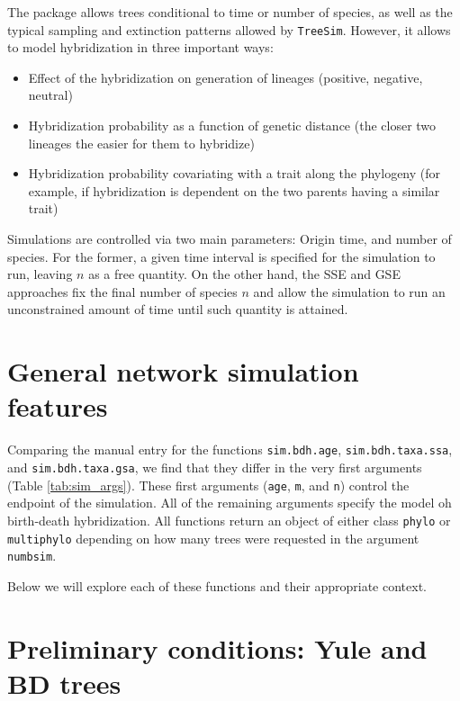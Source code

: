 \documentclass[]{article}
\providecommand{\tightlist}{%
  \setlength{\itemsep}{0pt}\setlength{\parskip}{0pt}}
\begin{document}
The package allows trees conditional to time or number of species, as
well as the typical sampling and extinction patterns allowed by
\texttt{TreeSim}. However, it allows to model hybridization in three
important ways:

\begin{itemize}
\tightlist
\item
  Effect of the hybridization on generation of lineages (positive,
  negative, neutral)
\item
  Hybridization probability as a function of genetic distance (the
  closer two lineages the easier for them to hybridize)
\item
  Hybridization probability covariating with a trait along the phylogeny
  (for example, if hybridization is dependent on the two parents having
  a similar trait)
\end{itemize}

Simulations are controlled via two main parameters: Origin time, and
number of species. For the former, a given time interval is specified
for the simulation to run, leaving \(n\) as a free quantity. On the
other hand, the SSE and GSE approaches fix the final number of species
\(n\) and allow the simulation to run an unconstrained amount of time
until such quantity is attained.

\section{General network simulation
features}\label{general-network-simulation-features}

Comparing the manual entry for the functions \texttt{sim.bdh.age},
\texttt{sim.bdh.taxa.ssa}, and \texttt{sim.bdh.taxa.gsa}, we find that
they differ in the very first arguments (Table \ref{tab:sim_args}).
These first arguments (\texttt{age}, \texttt{m}, and \texttt{n}) control
the endpoint of the simulation. All of the remaining arguments specify
the model oh birth-death hybridization. All functions return an object
of either class \texttt{phylo} or \texttt{multiphylo} depending on how
many trees were requested in the argument \texttt{numbsim}.

Below we will explore each of these functions and their appropriate
context.

\section{Preliminary conditions: Yule and BD
trees}\label{preliminary-conditions-yule-and-bd-trees}
\end{document}
